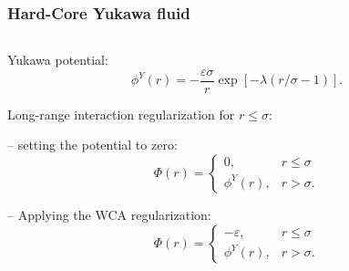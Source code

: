 \documentclass[8pt]{beamer}
\begin{document}
	\begin{frame}
		\frametitle{Hard-Core Yukawa fluid}
		
		\begin{columns}
			\begin{column}{0.5\textwidth}
				Yukawa potential:
				\begin{equation*}
					\label{def:yukawa}
					\phi^Y(r) = -\frac{\varepsilon \sigma}{r} \exp[-\lambda(r/\sigma - 1)].
				\end{equation*}
				
				Long-range interaction regularization for $r \leq \sigma$:
				\hfill
				\\
				\hfill
				
				-- setting the potential to zero:
				\begin{equation*}
					\Phi(r) = \left\{
					\begin{array}{ll}
						0, & r \leq \sigma 
						\\
						\phi^Y(r), & r > \sigma.
					\end{array}
					\right.
				\end{equation*}
				
				-- Applying the WCA regularization:
				\begin{equation*}
					\Phi(r) = \left\{
					\begin{array}{ll}
						-\varepsilon, & r \leq \sigma 
						\\
						\phi^Y(r), & r > \sigma.
					\end{array}
					\right.
				\end{equation*}
			\end{column}
			

\end{columns}
\end{frame}
\end{document}
